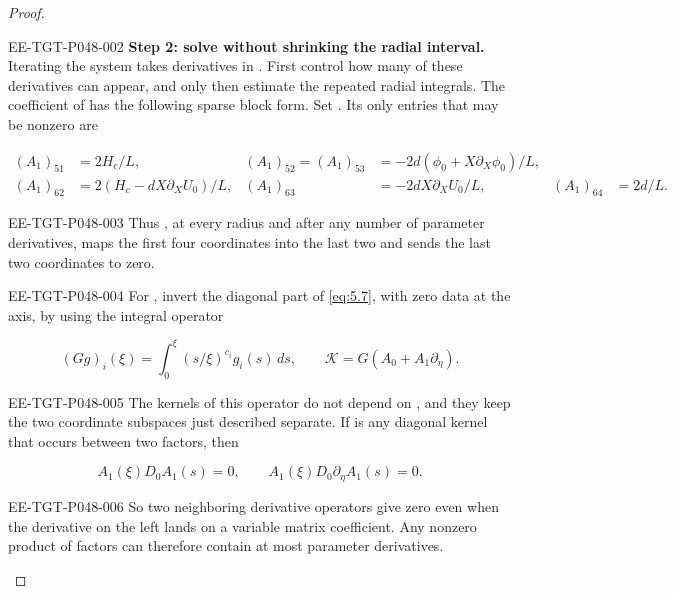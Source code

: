 \begin{proof}
\begin{EESegment}{EE-TGT-P048-002}
\textbf{Step 2: solve without shrinking the radial interval.} Iterating the system takes
derivatives in . First control how many of these derivatives can appear,
and only then estimate the repeated radial integrals. The coefficient of
 has the following sparse block form. Set
. Its only entries that may be nonzero are
\end{EESegment}
\begin{align*}
(A_1)_{51}&=2H_c/L,
& (A_1)_{52}=(A_1)_{53}&=-2d(\phi_0+X\partial_X\phi_0)/L,\\
(A_1)_{62}&=2(H_c-dX\partial_XU_0)/L,
& (A_1)_{63}&=-2dX\partial_XU_0/L,
& (A_1)_{64}&=2d/L.
\end{align*}
\begin{EESegment}{EE-TGT-P048-003}
Thus , at every radius and after any number of parameter derivatives,
maps the first four coordinates into the last two and sends the last two coordinates to zero.
\end{EESegment}

\begin{EESegment}{EE-TGT-P048-004}
For , invert the diagonal part of \eqref{eq:5.7},
with zero data at the axis, by using the integral operator
\end{EESegment}
\[
(Gg)_i(\xi)=\int_0^\xi(s/\xi)^{c_i}g_i(s)\,ds,
\qquad \mathcal K=G(A_0+A_1\partial_\eta).
\]
\begin{EESegment}{EE-TGT-P048-005}
The kernels of this operator do not depend on , and they keep the two
coordinate subspaces just described separate. If  is any diagonal kernel
that occurs between two factors, then
\end{EESegment}
\[
A_1(\xi)D_0A_1(s)=0,
\qquad A_1(\xi)D_0\partial_\eta A_1(s)=0.
\]
\begin{EESegment}{EE-TGT-P048-006}
So two neighboring derivative operators give zero even when the derivative on the left lands on a
variable matrix coefficient. Any nonzero product of  factors can therefore
contain at most  parameter derivatives.
\end{EESegment}


\end{proof}
